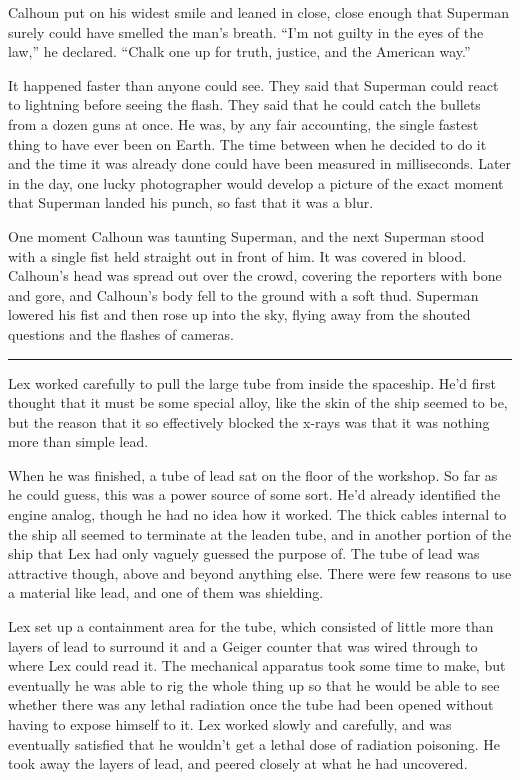 \documentclass[ebook,12pt]{memoir}
\begin{document}
Calhoun put on his widest smile and leaned in close, close enough that
Superman surely could have smelled the man's breath. ``I'm not guilty in
the eyes of the law,'' he declared. ``Chalk one up for truth, justice,
and the American way.''

It happened faster than anyone could see. They said that Superman could
react to lightning before seeing the flash. They said that he could
catch the bullets from a dozen guns at once. He was, by any fair
accounting, the single fastest thing to have ever been on Earth. The
time between when he decided to do it and the time it was already done
could have been measured in milliseconds. Later in the day, one lucky
photographer would develop a picture of the exact moment that Superman
landed his punch, so fast that it was a blur.

One moment Calhoun was taunting Superman, and the next Superman stood
with a single fist held straight out in front of him. It was covered in
blood. Calhoun's head was spread out over the crowd, covering the
reporters with bone and gore, and Calhoun's body fell to the ground with
a soft thud. Superman lowered his fist and then rose up into the sky,
flying away from the shouted questions and the flashes of cameras.

\begin{center}\rule{0.5\linewidth}{0.5pt}\end{center}

Lex worked carefully to pull the large tube from inside the spaceship.
He'd first thought that it must be some special alloy, like the skin of
the ship seemed to be, but the reason that it so effectively blocked the
x‐rays was that it was nothing more than simple lead.

When he was finished, a tube of lead sat on the floor of the workshop.
So far as he could guess, this was a power source of some sort. He'd
already identified the engine analog, though he had no idea how it
worked. The thick cables internal to the ship all seemed to terminate at
the leaden tube, and in another portion of the ship that Lex had only
vaguely guessed the purpose of. The tube of lead was attractive though,
above and beyond anything else. There were few reasons to use a material
like lead, and one of them was shielding.

Lex set up a containment area for the tube, which consisted of little
more than layers of lead to surround it and a Geiger counter that was
wired through to where Lex could read it. The mechanical apparatus took
some time to make, but eventually he was able to rig the whole thing up
so that he would be able to see whether there was any lethal radiation
once the tube had been opened without having to expose himself to it.
Lex worked slowly and carefully, and was eventually satisfied that he
wouldn't get a lethal dose of radiation poisoning. He took away the
layers of lead, and peered closely at what he had uncovered.
\end{document}
